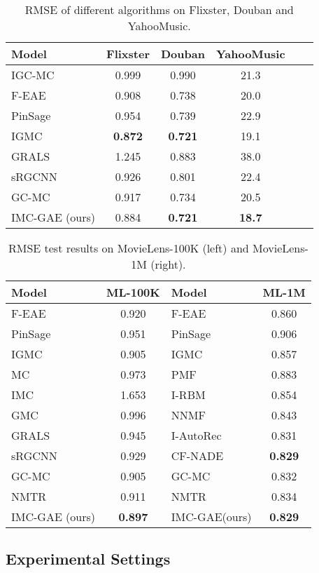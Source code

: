 \documentclass[sigconf]{acmart}
\begin{document}
\begin{table}
  \caption{RMSE of different algorithms on Flixster, Douban and YahooMusic.}
  \label{tab:rmse_spare}
  \begin{tabular}{lccccc}
    \toprule
    \textbf{Model} &\textbf{Flixster}&\textbf{Douban}&\textbf{YahooMusic}\\
    \midrule
    IGC-MC  & 0.999 & 0.990 & 21.3\\
    F-EAE & 0.908 & 0.738 & 20.0\\
    PinSage & 0.954 & 0.739 & 22.9\\
    IGMC &\textbf{0.872} & \textbf{0.721} & 19.1\\
    \midrule
    GRALS  & 1.245 & 0.883 & 38.0\\
    sRGCNN & 0.926 & 0.801 & 22.4\\
    GC-MC & 0.917 & 0.734 & 20.5\\
    IMC-GAE (ours) & 0.884 & \textbf{0.721} & \textbf{18.7}\\
  \bottomrule
\end{tabular}
\end{table}

\begin{table}
  \caption{RMSE test results on MovieLens-100K (left) and MovieLens-1M (right).}
  \label{tab:rmse_dense}
  \begin{tabular}{lc|lc}
    \toprule
    \textbf{Model}&\textbf{ML-100K}&\textbf{Model}&\textbf{ML-1M}\\
    \midrule
    F-EAE & 0.920 & F-EAE & 0.860\\
    PinSage & 0.951 & PinSage & 0.906\\
    IGMC & 0.905 & IGMC & 0.857\\
    \midrule
    MC & 0.973 & PMF & 0.883\\
    IMC & 1.653 & I-RBM & 0.854\\
    GMC & 0.996 & NNMF & 0.843\\
    GRALS   & 0.945 & I-AutoRec & 0.831\\
    sRGCNN & 0.929 & CF-NADE & \textbf{0.829}\\
    GC-MC & 0.905 & GC-MC &  0.832\\
    NMTR & 0.911 & NMTR & 0.834 \\
    IMC-GAE (ours) & \textbf{0.897} & IMC-GAE(ours) & \textbf{0.829}\\
  \bottomrule
\end{tabular}
\end{table}
\subsection{Experimental Settings}
\end{document}
